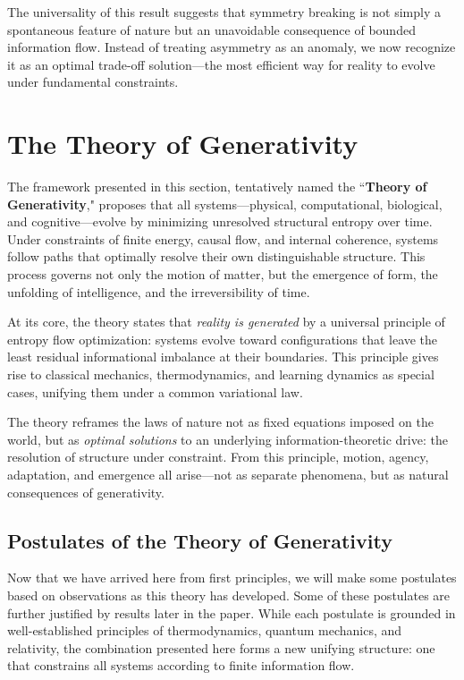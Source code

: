 \documentclass[12pt]{article}
\begin{document}
The universality of this result suggests that symmetry breaking is not simply a spontaneous feature of nature but an unavoidable consequence of bounded information flow. Instead of treating asymmetry as an anomaly, we now recognize it as an optimal trade-off solution—the most efficient way for reality to evolve under fundamental constraints.

\section{The Theory of Generativity}

The framework presented in this section, tentatively named the ``\textbf{Theory of Generativity}," proposes that all systems—physical, computational, biological, and cognitive—evolve by minimizing unresolved structural entropy over time. Under constraints of finite energy, causal flow, and internal coherence, systems follow paths that optimally resolve their own distinguishable structure. This process governs not only the motion of matter, but the emergence of form, the unfolding of intelligence, and the irreversibility of time.

At its core, the theory states that \emph{reality is generated} by a universal principle of entropy flow optimization: systems evolve toward configurations that leave the least residual informational imbalance at their boundaries. This principle gives rise to classical mechanics, thermodynamics, and learning dynamics as special cases, unifying them under a common variational law.

The theory reframes the laws of nature not as fixed equations imposed on the world, but as \emph{optimal solutions} to an underlying information-theoretic drive: the resolution of structure under constraint. From this principle, motion, agency, adaptation, and emergence all arise—not as separate phenomena, but as natural consequences of generativity.

\subsection{Postulates of the Theory of Generativity}

Now that we have arrived here from first principles, we will make some postulates based on observations as this theory has developed. Some of these postulates are further justified by results later in the paper. While each postulate is grounded in well-established principles of thermodynamics, quantum mechanics, and relativity, the combination presented here forms a new unifying structure: one that constrains all systems according to finite information flow.
\end{document}
